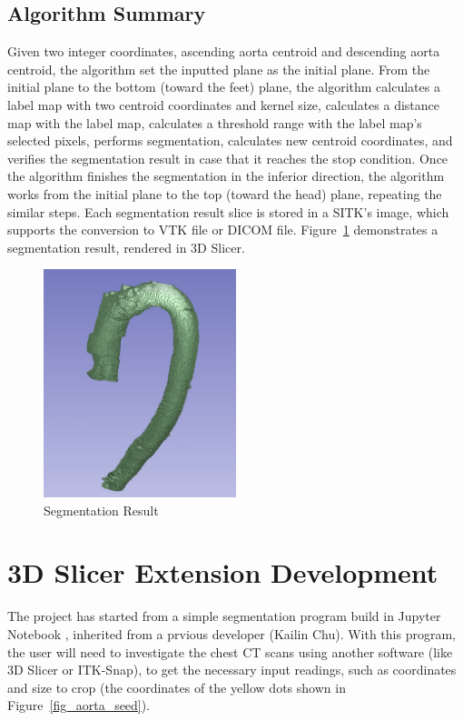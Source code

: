 \subsection{Algorithm Summary}
Given two integer coordinates, ascending aorta centroid and descending aorta centroid, the algorithm set the inputted plane as the initial plane. From the initial plane to the bottom (toward the feet) plane, the algorithm calculates a label map with two centroid coordinates and kernel size, calculates a distance map with the label map, calculates a threshold range with the label map's selected pixels, performs segmentation, calculates new centroid coordinates, and verifies the segmentation result in case that it reaches the stop condition. Once the algorithm finishes the segmentation in the inferior direction, the algorithm works from the initial plane to the top (toward the head) plane, repeating the similar steps. Each segmentation result slice is stored in a SITK's image, which supports the conversion to VTK file or DICOM file. Figure~\ref{fig_sr} demonstrates a segmentation result, rendered in 3D Slicer.

\begin{figure}[H]
    \centering
    \includegraphics[width=0.5\textwidth]{figures/AGR/segmentation_result.jpg}
    \caption[Segmentation Result]{Segmentation Result}
    \label{fig_sr}
\end{figure}

\section{3D Slicer Extension Development}
The project has started from a simple segmentation program build in Jupyter Notebook \cite{Kluyver2016jupyter}, inherited from a prvious developer (Kailin Chu). With this program, the user will need to investigate the chest CT scans using another software (like 3D Slicer or ITK-Snap), to get the necessary input readings, such as coordinates and size to crop (the coordinates of the yellow dots shown in Figure~\ref{fig_aorta_seed}).

